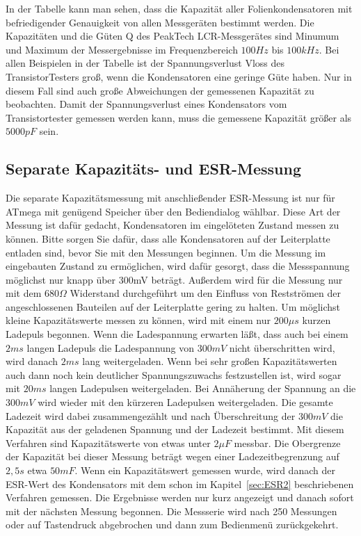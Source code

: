 In der Tabelle kann man sehen, dass die Kapazität aller Folienkondensatoren mit befriedigender Genauigkeit von allen
Messgeräten bestimmt werden. Die Kapazitäten und die Güten Q des PeakTech LCR-Messgerätes sind Minumum
und Maximum der Messergebnisse im Frequenzbereich \(100 Hz\) bis \(100 kHz\).
Bei allen Beispielen in der Tabelle ist der Spannungsverlust Vloss des TransistorTesters groß,
wenn die Kondensatoren eine geringe Güte haben. Nur in diesem Fall sind auch große Abweichungen
der gemessenen Kapazität zu beobachten. Damit der Spannungsverlust eines Kondensators vom
Transistortester gemessen werden kann, muss die gemessene Kapazität größer als \(5000 pF\) sein.

\subsection{Separate Kapazitäts- und ESR-Messung}
Die separate Kapazitätsmessung mit anschließender ESR-Messung ist nur für ATmega mit genügend Speicher
über den Bediendialog wählbar. Diese Art der Messung ist dafür gedacht, Kondensatoren im eingelöteten
Zustand messen zu können. 
Bitte sorgen Sie dafür, dass alle Kondensatoren auf der Leiterplatte entladen sind, bevor Sie mit den
Messungen beginnen.
Um die Messung im eingebauten Zustand zu ermöglichen, wird dafür gesorgt,
dass die Messspannung möglichst nur knapp über 300mV beträgt.
Außerdem wird für die Messung nur mit dem \(680 \Omega\) Widerstand durchgeführt um den Einfluss von
Restströmen der angeschlossenen Bauteilen auf der Leiterplatte gering zu halten.
Um möglichst kleine Kapazitätswerte messen zu können, wird mit einem nur \(200 \mu s\) kurzen Ladepuls
begonnen. Wenn die Ladespannung erwarten läßt, dass auch bei einem \(2 ms\) langen Ladepuls die Ladespannung
von \(300 mV\) nicht überschritten wird, wird danach \(2 ms\) lang weitergeladen. Wenn bei sehr großen
Kapazitätswerten auch dann noch kein deutlicher Spannungszuwachs festzustellen ist, wird sogar mit
\(20 ms\) langen Ladepulsen weitergeladen. Bei Annäherung der Spannung an die \(300 mV\) wird wieder
mit den kürzeren Ladepulsen weitergeladen. Die gesamte Ladezeit wird dabei zusammengezählt und nach
Überschreitung der \(300 mV\) die Kapazität aus der geladenen Spannung und der Ladezeit bestimmt.
Mit diesem Verfahren sind Kapazitätswerte von etwas unter \(2 \mu F\) messbar. Die Obergrenze der Kapazität
bei dieser Messung beträgt wegen einer Ladezeitbegrenzung auf \(2,5 s\) etwa \(50 mF\).
Wenn ein Kapazitätswert gemessen wurde, wird danach der ESR-Wert des Kondensators mit dem schon
im Kapitel~\ref{sec:ESR2} beschriebenen Verfahren gemessen.
Die Ergebnisse werden nur kurz angezeigt und danach sofort mit der nächsten Messung begonnen.
Die Messserie wird nach 250 Messungen oder auf Tastendruck abgebrochen und dann zum Bedienmenü zurückgekehrt.

